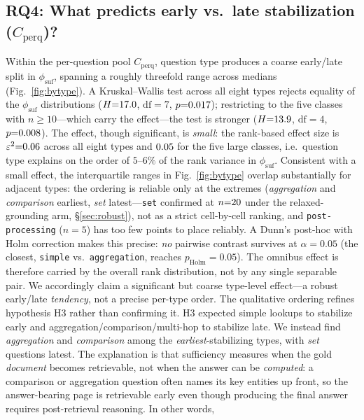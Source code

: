 \subsection{RQ4: What predicts early vs.\ late stabilization ($C_{\mathrm{perq}}$)?}
\label{sec:rq4}
Within the per-question pool $C_{\mathrm{perq}}$, question type produces a coarse
early/late split in $\phi_{\mathrm{suf}}$, spanning a roughly threefold range
across medians (Fig.~\ref{fig:bytype}). A Kruskal--Wallis
test across all eight types rejects equality of the $\phi_{\mathrm{suf}}$
distributions ($H{=}17.0{}$, $\mathrm{df}{=}7$, $p{=}0.017{}$); restricting to
the five classes with $n\ge10$---which carry the effect---the test is stronger
($H{=}13.9{}$, $\mathrm{df}{=}4$, $p{=}0.008{}$). The effect, though
significant, is \emph{small}: the rank-based effect size is
$\varepsilon^2{=}0.06{}$ across all eight types and $0.05{}$ for the five
large classes, i.e.\ question type explains on the order of $5$--$6\%$ of the rank
variance in $\phi_{\mathrm{suf}}$. Consistent with a small effect, the interquartile ranges in Fig.~\ref{fig:bytype}
overlap substantially for adjacent types: the ordering is reliable only at the extremes (\emph{aggregation} and
\emph{comparison} earliest, \emph{set} latest---\texttt{set} confirmed at
$n{=}20{}$ under the relaxed-grounding arm, \S\ref{sec:robust}), not as a
strict cell-by-cell ranking, and \texttt{post-processing} ($n{=}5$) has too few
points to place reliably. A Dunn's post-hoc with Holm correction
makes this precise: \emph{no} pairwise contrast survives at $\alpha{=}0.05$ (the
closest, \texttt{simple} vs.\ \texttt{aggregation}, reaches $p_{\mathrm{Holm}}{=}0.05$).
The omnibus effect is therefore carried by the overall rank distribution, not by any
single separable pair. We accordingly claim a significant but coarse
type-level effect---a robust early/late \emph{tendency}, not a precise per-type order.
The qualitative ordering refines
hypothesis H3 rather than confirming it. H3 expected simple lookups to stabilize
early and aggregation/comparison/multi-hop to stabilize late. We instead find
\emph{aggregation} and \emph{comparison} among the \emph{earliest}-stabilizing
types, with \emph{set} questions latest. The explanation is that sufficiency
measures when the gold \emph{document} becomes retrievable, not when the answer can
be \emph{computed}: a comparison or aggregation question often names its key
entities up front, so the answer-bearing page is retrievable early even though
producing the final answer requires post-retrieval reasoning. In other words,
